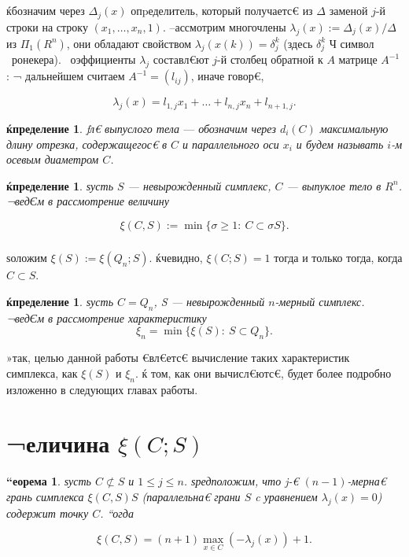 \documentclass[12pt]{article} %
\begin{document}
	
	\subparagraph{} ќбозначим через $\Delta_j(x)$ опpеделитель, который получаетс€ из $\Delta$ заменой $j$-й строки на строку $(x_1,\dots, x_n, 1)$. –ассмотрим многочлены $\lambda_j(x) := \Delta_j(x)/\Delta$ из $\Pi_1(R^n)$, они обладают свойством $\lambda_j(x(k)) = \delta_j^k$ (здесь $\delta_j^k$ Ч символ  ронекера).  оэффициенты $\lambda_j$ составл€ют $j$-й столбец обратной к $A$ матрице $A^{-1}$: ¬ дальнейшем считаем $A^{-1} = (l_{ij})$, иначе говор€,
	
	\begin{equation}\label{f2}
		\lambda_j(x) = l_{1,j}x_1 + \dots + l_{n,j}x_{n} + l_{n+1,j}.
	\end{equation}
	
	\newtheorem{Def2}[Def]{ќпределение}
	\begin{Def2}ƒл€ выпуслого тела $—$ обозначим через $d_i(C)$ максимальную длину отрезка, содержащегос€ в $C$ и параллельного оси $x_i$ и будем называть $i$-м осевым диаметром $C$.
	\end{Def2}
	
	\newtheorem{Def5}[Def]{ќпределение}
	\begin{Def5}
		ѕусть $S$ --- невырожденный симплекс, $C$ --- выпуклое тело в $R^n$. ¬ведЄм в рассмотрение величину
	\end{Def5}
	
	\begin{equation}\label{f9}
	\xi(C, S):=\min \{\sigma \geq 1:\ C \subset \sigma S\}.
	\end{equation}
	
	\subparagraph{} ѕоложим $\xi (S):=\xi (Q_n;S)$. ќчевидно, $\xi(C; S)=1$ тогда и только тогда, когда $C \subset S$.
	
	\newtheorem{Def6}[Def]{ќпределение}
	\begin{Def6}
		ѕусть $C=Q_n$, S --- невырожденный $n$-мерный симплекс. ¬ведЄм в рассмотрение характеристику
		\begin{equation}\label{f11}
			\xi_n = \min \{\xi(S):\ S \subset Q_n\}.
		\end{equation}
	\end{Def6}	 
	
	»так, целью данной работы €вл€етс€ вычисление таких характеристик симплекса, как $\xi (S)$ и $\xi_n$. ќ том, как они вычисл€ютс€, будет более подробно изложенно в следующих главах работы.
	
	\newpage
	
	
	
	
	
	
	\section{¬еличина $\xi (C; S)$}   	
	\newtheorem{Th}{“еорема}
	\begin{Th}ѕусть $C \not \subset S$ и $1 \leq j \leq n$. ѕредположим, что j-€ $(n-1)$-мерна€ грань симплекса
	$\xi(C, S)S$ (параллельна€ грани $S$ c уравнением $\lambda_j(x)=0$) содержит точку $C$. “огда
		
		\begin{equation}\label{f10}
		\xi(C, S) = (n+1) \max_{x \in C} (-\lambda_j(x)) + 1.
		\end{equation}
	\end{Th}
	
\end{document}
